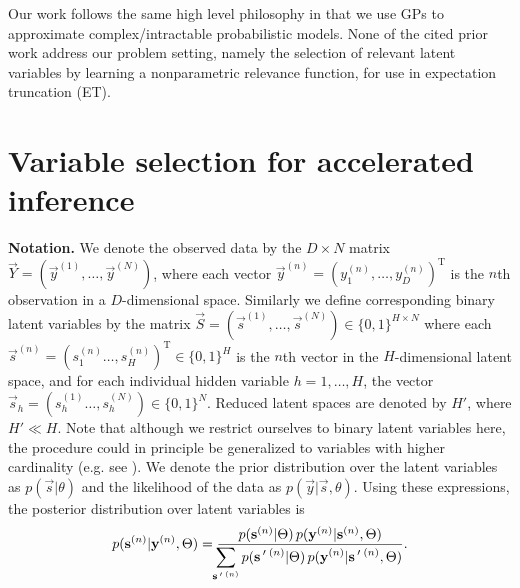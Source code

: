 Our work follows the same high level philosophy in that we use GPs to approximate complex/intractable probabilistic models. None of the cited prior work address our problem setting, namely the selection of relevant latent variables by learning a nonparametric relevance function, for use in expectation truncation (ET).

\section{Variable selection for accelerated inference}
\label{method}
%
\textbf{Notation.}
We denote the observed data by the $D\times N$ matrix $\vec{Y}=(\vec{y}^{(1)}, \dots, \vec{y}^{(N)})$, where each vector $\vec{y}^{(n)} = ( y_1^{(n)}, \dots, y_D^{(n)})^\mathrm{T}$ is the $n$th observation 
in a $D$-dimensional space.
Similarly we define corresponding 
binary latent variables 
by the matrix $\vec{S} = (\vec{s}^{(1)}, \dots, \vec{s}^{(N)})\in \{0,1\}^{H \times N}$ 
where each $\vec{s}^{(n)}=(s_1^{(n)}\dots, s^{(n)}_H)^\mathrm{T} \in \{0,1\}^{H}$ is the $n$th vector in the $H$-dimensional latent space,
and for each individual hidden variable $h=1,\dots,H$, the vector $\vec{s}_h=(s_h^{(1)}\dots, s^{(N)}_h)\in \{0,1\}^{N}$. 
Reduced latent spaces are denoted by $H'$, where $H' \ll H$. 
Note that although we restrict ourselves to binary latent variables here, 
the procedure could in principle be generalized to variables with higher cardinality (e.g. see \citep{ExarchakisEtAl2012}).
We denote the prior distribution over the latent variables as $p(\vec{s} | \theta)$ 
and the likelihood of the data as $p(\vec{y} | \vec{s}, \theta)$.
Using these expressions, the posterior distribution over latent variables is 
%
\vspace{-.1cm}
\begin{equation}
\label{eq:post}
p({\mathbf{s}}^{(n)}|{\mathbf{y}}^{(n)},\Theta)  = \frac{p({\mathbf{s}}^{(n)} | \Theta) \, p({\mathbf{y}}^{(n)} | {\mathbf{s}}^{(n)}, \Theta)}
{\displaystyle\hspace{-1.5mm}\sum_{{\mathbf{s}}\,'\,^{(n)}} p({\mathbf{s}}\,'\,^{(n)} | \Theta) \, p({\mathbf{y}}^{(n)} | {\mathbf{s}}\,'\,^{(n)}, \Theta)}.
\end{equation}
\vspace{-.5cm}

